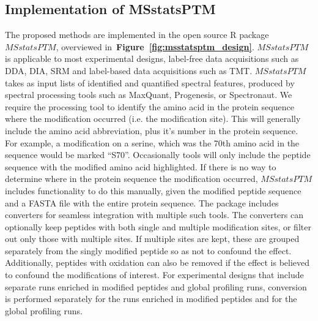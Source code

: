\documentclass[mcp]{article}
\numberwithin{table}{section}
\def\figref#1{{\bf Figure~\ref{fig:#1}}}
\begin{document}
\subsection*{Implementation of MSstatsPTM}

The proposed methods are implemented in the open source R package $MSstatsPTM$, overviewed in~\figref{msstatsptm_design}. $MSstatsPTM$ is applicable to most experimental designs, label-free data acquisitions such as DDA, DIA, SRM and label-based data acquisitions such as TMT. $MSstatsPTM$ takes as input lists of identified and quantified spectral features, produced by spectral processing tools such as MaxQuant, Progenesis, or Spectronaut. We require the processing tool to identify the amino acid in the protein sequence where the modification occurred (i.e. the modification site). This will generally include the amino acid abbreviation, plus it's number in the protein sequence. For example, a modification on a serine, which was the 70th amino acid in the sequence would be marked ``S70''.  
Occasionally tools will only include the peptide sequence with the modified amino acid highlighted. If there is no way to determine where in the protein sequence the modification occurred, $MSstatsPTM$ includes functionality to do this manually, given the modified peptide sequence and a FASTA file with the entire protein sequence. The package includes converters for seamless integration with multiple such tools. The converters can optionally keep peptides with both single and multiple modification sites, or filter out only those with multiple sites. If multiple sites are kept, these are grouped separately from the singly modified peptide so as not to confound the effect. Additionally, peptides with oxidation can also be removed if the effect is believed to confound the modifications of interest. For experimental designs that include separate runs enriched in modified peptides and global profiling runs, conversion is performed separately for the runs enriched in modified peptides and for the global profiling runs.
\end{document}
